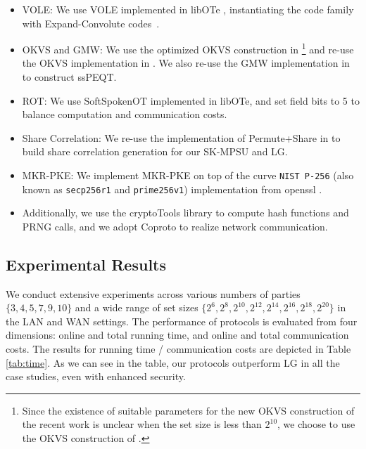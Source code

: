\begin{itemize}
\item VOLE: We use VOLE implemented in \textsf{libOTe} \cite{libOTe}, instantiating the code family with Expand-Convolute codes~\cite{RRT23}.
\item OKVS and GMW: We use the optimized OKVS construction in \cite{RR-CCS-2022}\footnote{Since the existence of suitable parameters for the new OKVS construction of the recent work \cite{BPSY-USENIX-2023} is unclear when the set size is less than $2^{10}$, we choose to use the OKVS construction of \cite{RR-CCS-2022}. } and re-use the OKVS implementation in \cite{lib-volepsi}. We also re-use the GMW implementation in \cite{lib-volepsi} to construct ssPEQT.
\item ROT: We use SoftSpokenOT \cite{Roy22} implemented in \textsf{libOTe}, and set field bits to 5 to balance computation and communication costs. 
\item Share Correlation: We re-use the implementation of Permute+Share \cite{MS13,CGP-ASIACRYPT-2020} in \cite{lib-psu} to build share correlation generation for our SK-MPSU and LG.
\item MKR-PKE: We implement MKR-PKE on top of the curve \texttt{NIST P-256} (also known as \texttt{secp256r1} and \texttt{prime256v1}) implementation from \textsf{openssl} \cite{lib-openssl}.
\item Additionally, we use the \textsf{cryptoTools} \cite{lib-cryptoTools} library to compute hash functions and PRNG calls, and we adopt \textsf{Coproto} \cite{lib-coproto} to realize network communication.
\end{itemize}

\subsection{Experimental Results}

We conduct extensive experiments across various numbers of parties $\{3,4,5,7,9,10\}$ and a wide range of set sizes $\{2^6,2^8,2^{10},2^{12},2^{14},2^{16},2^{18},2^{20}\}$ in the LAN and WAN settings. The performance of protocols is evaluated from four dimensions: online and total running time, and online and total communication costs. The results for running time / communication costs are depicted in Table \ref{tab:time}. As we can see in the table, our protocols outperform LG in all the case studies, even with enhanced security.

